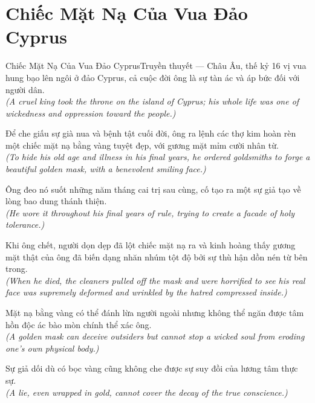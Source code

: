 \section{Chiếc Mặt Nạ Của Vua Đảo Cyprus}
\begin{truyen}{Chiếc Mặt Nạ Của Vua Đảo Cyprus}{Truyền thuyết --- Châu Âu, thế kỷ 16}
 vị vua hung bạo lên ngôi ở đảo Cyprus, cả cuộc đời ông là sự tàn ác và áp bức đối với người dân.\\[4pt]
\textit{(A cruel king took the throne on the island of Cyprus; his whole life was one of wickedness and oppression toward the people.)}

Để che giấu sự già nua và bệnh tật cuối đời, ông ra lệnh các thợ kim hoàn rèn một chiếc mặt nạ bằng vàng tuyệt đẹp, với gương mặt mỉm cười nhân từ.\\[4pt]
\textit{(To hide his old age and illness in his final years, he ordered goldsmiths to forge a beautiful golden mask, with a benevolent smiling face.)}

Ông đeo nó suốt những năm tháng cai trị sau cùng, cố tạo ra một sự giả tạo về lòng bao dung thánh thiện.\\[4pt]
\textit{(He wore it throughout his final years of rule, trying to create a facade of holy tolerance.)}

Khi ông chết, người dọn dẹp đã lột chiếc mặt nạ ra và kinh hoàng thấy gương mặt thật của ông đã biến dạng nhăn nhúm tột độ bởi sự thù hận dồn nén từ bên trong.\\[4pt]
\textit{(When he died, the cleaners pulled off the mask and were horrified to see his real face was supremely deformed and wrinkled by the hatred compressed inside.)}

Mặt nạ bằng vàng có thể đánh lừa người ngoài nhưng không thể ngăn được tâm hồn độc ác bào mòn chính thể xác ông.\\[4pt]
\textit{(A golden mask can deceive outsiders but cannot stop a wicked soul from eroding one's own physical body.)}

\end{truyen}
\begin{baihoc}
  Sự giả dối dù có bọc vàng cũng không che được sự suy đồi của lương tâm thực sự.\\[4pt]
  \textit{(A lie, even wrapped in gold, cannot cover the decay of the true conscience.)}
\end{baihoc}

